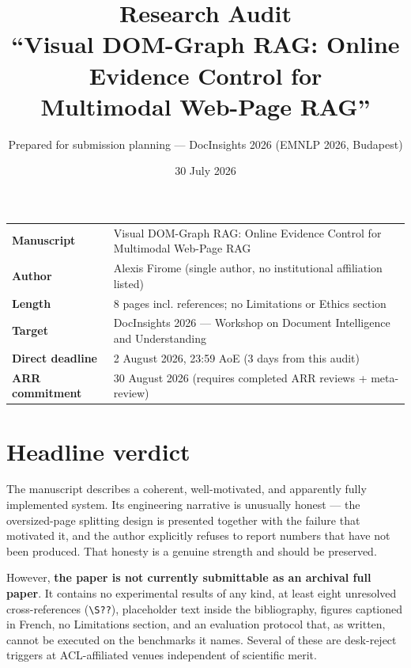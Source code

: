 \documentclass[11pt,a4paper]{article}
\title{\textbf{Research Audit}\\[0.35em]
\large ``Visual DOM-Graph RAG: Online Evidence Control for\\ Multimodal Web-Page RAG''}
\author{Prepared for submission planning --- DocInsights 2026 (EMNLP 2026, Budapest)}
\date{30 July 2026}
\begin{document}
\maketitle

\begin{center}
\begin{tabularx}{\textwidth}{@{}lX@{}}
\toprule
\textbf{Manuscript} & Visual DOM-Graph RAG: Online Evidence Control for Multimodal Web-Page RAG \\
\textbf{Author} & Alexis Firome (single author, no institutional affiliation listed) \\
\textbf{Length} & 8 pages incl. references; no Limitations or Ethics section \\
\textbf{Target} & DocInsights 2026 --- Workshop on Document Intelligence and Understanding \\
\textbf{Direct deadline} & 2 August 2026, 23:59 AoE \hfill \textcolor{blockred}{(3 days from this audit)} \\
\textbf{ARR commitment} & 30 August 2026 (requires completed ARR reviews + meta-review) \\
\bottomrule
\end{tabularx}
\end{center}

\vspace{0.6em}

\section{Headline verdict}

The manuscript describes a coherent, well-motivated, and apparently fully implemented
system. Its engineering narrative is unusually honest --- the oversized-page splitting
design is presented together with the failure that motivated it, and the author explicitly
refuses to report numbers that have not been produced. That honesty is a genuine strength
and should be preserved.

However, \textbf{the paper is not currently submittable as an archival full paper}. It
contains no experimental results of any kind, at least eight unresolved cross-references
(\verb|\S??|), placeholder text inside the bibliography, figures captioned in French, no
Limitations section, and an evaluation protocol that, as written, cannot be executed on the
benchmarks it names. Several of these are desk-reject triggers at ACL-affiliated venues
independent of scientific merit.
\end{document}
